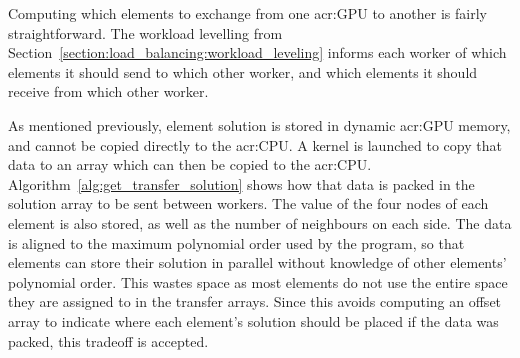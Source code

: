 Computing which elements to exchange from one \acrshort{acr:GPU} to another is fairly
straightforward. The workload levelling from Section~\ref{section:load_balancing:workload_leveling}
informs each worker of which elements it should send to which other worker, and which elements it
should receive from which other worker. 

As mentioned previously, element solution is stored in dynamic \acrshort{acr:GPU} memory, and cannot
be copied directly to the \acrshort{acr:CPU}. A kernel is launched to copy that data to an array
which can then be copied to the \acrshort{acr:CPU}. Algorithm~\ref{alg:get_transfer_solution} shows
how that data is packed in the solution array to be sent between workers. The value of the four
nodes of each element is also stored, as well as the number of neighbours on each side. The data is
aligned to the maximum polynomial order used by the program, so that elements can store their
solution in parallel without knowledge of other elements' polynomial order. This wastes space as
most elements do not use the entire space they are assigned to in the transfer arrays. Since this
avoids computing an offset array to indicate where each element's solution should be placed if the
data was packed, this tradeoff is accepted.

